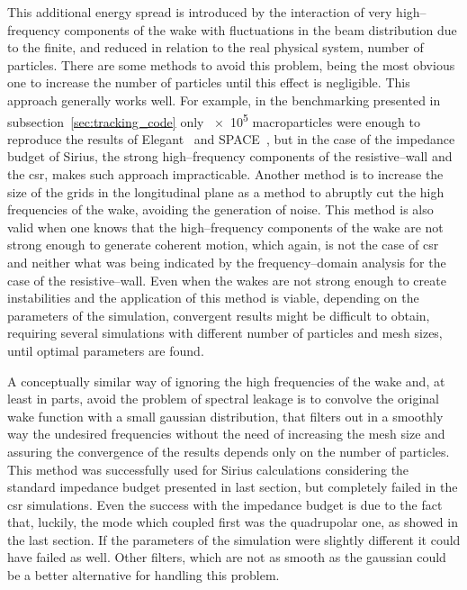     This additional energy spread is introduced by the interaction of very high--frequency components of the wake with fluctuations in the beam distribution due to the finite, and reduced in relation to the real physical system, number of particles. There are some methods to avoid this problem, being the most obvious one to increase the number of particles until this effect is negligible. This approach generally works well. For example, in the benchmarking presented in subsection~\ref{sec:tracking_code} only \num{e5} macroparticles were enough to reproduce the results of Elegant~\cite{Borland2000} and SPACE~\cite{Bassi2016}, but in the case of the impedance budget of Sirius, the strong high--frequency components of the resistive--wall and the \gls{csr}, makes such approach impracticable. Another method is to increase the size of the grids in the longitudinal plane as a method to abruptly cut the high frequencies of the wake, avoiding the generation of noise. This method is also valid when one knows that the high--frequency components of the wake are not strong enough to generate coherent motion, which again, is not the case of \gls{csr} and neither what was being indicated by the frequency--domain analysis for the case of the resistive--wall. Even when the wakes are not strong enough to create instabilities and the application of this method is viable, depending on the parameters of the simulation, convergent results might be difficult to obtain, requiring several simulations with different number of particles and mesh sizes, until optimal parameters are found.

    A conceptually similar way of ignoring the high frequencies of the wake and, at least in parts, avoid the problem of spectral leakage is to convolve the original wake function with a small gaussian distribution, that filters out in a smoothly way the undesired frequencies without the need of increasing the mesh size and assuring the convergence of the results depends only on the number of particles. This method was successfully used for Sirius calculations considering the standard impedance budget presented in last section, but completely failed in the \gls{csr} simulations. Even the success with the impedance budget is due to the fact that, luckily, the mode which coupled first was the quadrupolar one, as showed in the last section. If the parameters of the simulation were slightly different it could have failed as well. Other filters, which are not as smooth as the gaussian could be a better alternative for handling this problem.


